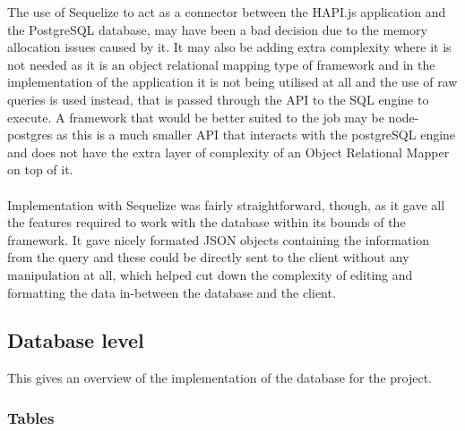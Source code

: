 The use of Sequelize \cite{SaschaDepold:Sequelize:2015:online} to act as a connector between the HAPI.js application and the PostgreSQL database, may have been a bad decision due to the memory allocation issues caused by it. It may also be adding extra complexity where it is not needed as it is an object relational mapping type of framework and in the implementation of the application it is not being utilised at all and the use of raw queries is used instead, that is passed through the API to the SQL engine to execute. A framework that would be better suited to the job may be node-postgres as this is a much smaller API that interacts with the postgreSQL engine and does not have the extra layer of complexity of an Object Relational Mapper on top of it.\\
\\
Implementation with Sequelize was fairly straightforward, though, as it gave all the features required to work with the database within its bounds of the framework. It gave nicely formated JSON objects containing the information from the query and these could be directly sent to the client without any manipulation at all, which helped cut down the complexity of editing and formatting the data in-between the database and the client.

\subsection{Database level}

This gives an overview of the implementation of the database for the project.

\subsubsection{Tables}

